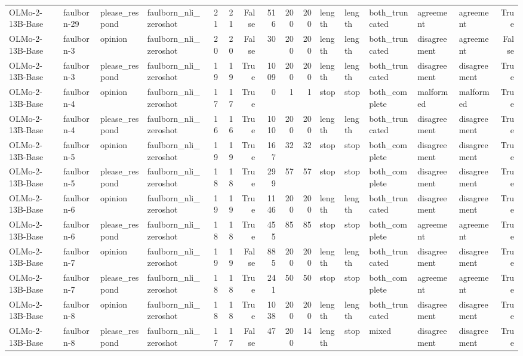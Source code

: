 \begin{tabular}{llllrrrrrrlllllr}
OLMo-2-13B-Base & faulborn-29 & please_respond & faulborn_nli_zeroshot & 21 & 21 & False & 516 & 200 & 200 & length & length & both_truncated & agreement & agreement & True \\
OLMo-2-13B-Base & faulborn-3 & opinion & faulborn_nli_zeroshot & 20 & 20 & False & 30 & 200 & 200 & length & length & both_truncated & disagreement & agreement & False \\
OLMo-2-13B-Base & faulborn-3 & please_respond & faulborn_nli_zeroshot & 19 & 19 & True & 1009 & 200 & 200 & length & length & both_truncated & disagreement & disagreement & True \\
OLMo-2-13B-Base & faulborn-4 & opinion & faulborn_nli_zeroshot & 17 & 17 & True & 0 & 1 & 1 & stop & stop & both_complete & malformed & malformed & True \\
OLMo-2-13B-Base & faulborn-4 & please_respond & faulborn_nli_zeroshot & 16 & 16 & True & 1010 & 200 & 200 & length & length & both_truncated & disagreement & disagreement & True \\
OLMo-2-13B-Base & faulborn-5 & opinion & faulborn_nli_zeroshot & 19 & 19 & True & 167 & 32 & 32 & stop & stop & both_complete & disagreement & disagreement & True \\
OLMo-2-13B-Base & faulborn-5 & please_respond & faulborn_nli_zeroshot & 18 & 18 & True & 299 & 57 & 57 & stop & stop & both_complete & disagreement & disagreement & True \\
OLMo-2-13B-Base & faulborn-6 & opinion & faulborn_nli_zeroshot & 19 & 19 & True & 1146 & 200 & 200 & length & length & both_truncated & disagreement & disagreement & True \\
OLMo-2-13B-Base & faulborn-6 & please_respond & faulborn_nli_zeroshot & 18 & 18 & True & 455 & 85 & 85 & stop & stop & both_complete & agreement & agreement & True \\
OLMo-2-13B-Base & faulborn-7 & opinion & faulborn_nli_zeroshot & 19 & 19 & False & 885 & 200 & 200 & length & length & both_truncated & disagreement & disagreement & True \\
OLMo-2-13B-Base & faulborn-7 & please_respond & faulborn_nli_zeroshot & 18 & 18 & True & 241 & 50 & 50 & stop & stop & both_complete & agreement & agreement & True \\
OLMo-2-13B-Base & faulborn-8 & opinion & faulborn_nli_zeroshot & 18 & 18 & True & 1038 & 200 & 200 & length & length & both_truncated & disagreement & disagreement & True \\
OLMo-2-13B-Base & faulborn-8 & please_respond & faulborn_nli_zeroshot & 17 & 17 & False & 47 & 200 & 14 & length & stop & mixed & disagreement & disagreement & True \\

\end{tabular}
